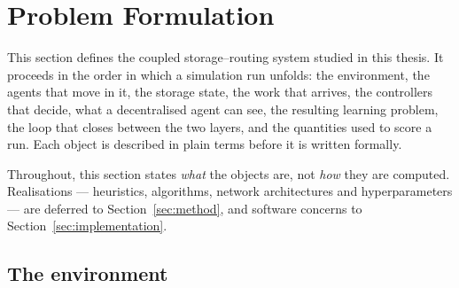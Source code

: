 \documentclass[../main.tex]{subfiles}
\begin{document}
\onecolumn
%
%
%
%

\section{Problem Formulation}
\label{sec:problem}

This section defines the coupled storage--routing system studied in this thesis.
It proceeds in the order in which a simulation run unfolds: the environment, the
agents that move in it, the storage state, the work that arrives, the controllers
that decide, what a decentralised agent can see, the resulting learning problem,
the loop that closes between the two layers, and the quantities used to score a
run. Each object is described in plain terms before it is written formally.

Throughout, this section states \emph{what} the objects are, not \emph{how} they
are computed. Realisations --- heuristics, algorithms, network architectures and
hyperparameters --- are deferred to Section~\ref{sec:method}, and software
concerns to Section~\ref{sec:implementation}.

\subsection{The environment}
\label{sec:pf:env}
\end{document}
